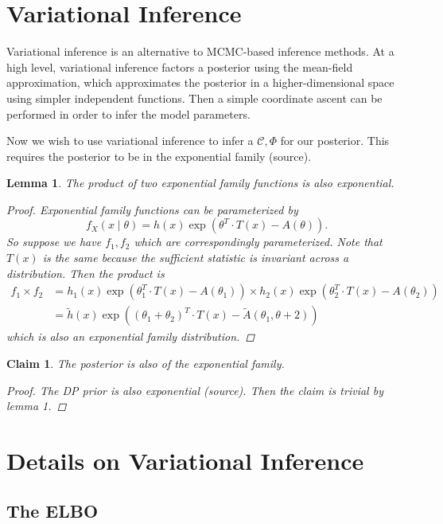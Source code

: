 \documentclass[11pt]{article}
\newtheorem{lemma}{Lemma}
\newtheorem{claim}{Claim}
\begin{document}
\section{Variational Inference}

Variational inference is an alternative to MCMC-based inference methods. At a high level, variational inference factors a posterior using the mean-field approximation, which approximates the posterior in a higher-dimensional space using simpler independent functions. Then a simple coordinate ascent can be performed in order to infer the model parameters.

Now we wish to use variational inference to infer a $\mathcal{C}, \Phi$ for our posterior. This requires the posterior to be in the exponential family (source).

\begin{lemma}
The product of two exponential family functions is also exponential.
\begin{proof}
Exponential family functions can be parameterized by $$f_X(x\mid\theta) = h(x) \exp \left (\theta^T \cdot T(x) -A(\theta)\right ).$$ So suppose we have $f_1, f_2$ which are correspondingly parameterized. Note that $T(x)$ is the same because the sufficient statistic is invariant across a distribution. Then the product is
\begin{align*}
f_1 \times f_2 &= h_1(x) \exp \left (\theta_1^T \cdot T(x) -A(\theta_1)\right ) \times h_2(x) \exp \left (\theta_2^T \cdot T(x) -A(\theta_2)\right )\\
			   &= \tilde{h}(x) \exp \left ((\theta_1 + \theta_2)^T \cdot T(x) -\tilde{A}(\theta_1, \theta+2)\right )
\end{align*}
which is also an exponential family distribution.
\end{proof}
\end{lemma}
\begin{claim}
The posterior is also of the exponential family.
\begin{proof}
    The DP prior is also exponential (source). Then the claim is trivial by lemma 1.
\end{proof}
\end{claim}
\newpage

\section{Details on Variational Inference}

\subsection{The \textsc{ELBO}}
\end{document}
